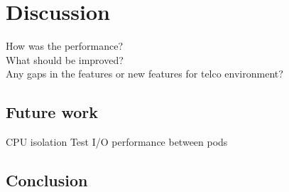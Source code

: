 \chapter{Discussion}
\label{chapter:discussion}

How was the performance? \\
What should be improved? \\
Any gaps in the features or new features for telco environment? \\

\section{Future work}

CPU isolation
Test I/O performance between pods


\section{Conclusion}